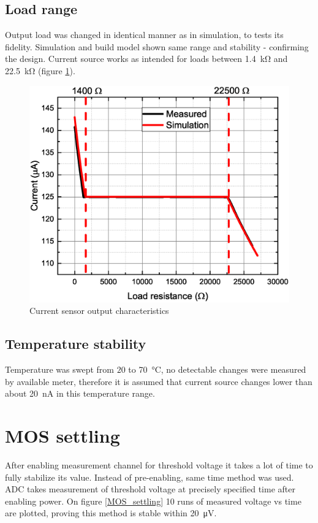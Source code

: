     \subsection{Load range}
        Output load was changed in identical manner as in simulation, to tests its fidelity. Simulation and build model shown same range and stability - confirming the design. Current source works as intended for loads between \SI{1.4}{\kilo\ohm} and \SI{22.5}{\kilo\ohm} (figure \ref{Current_sensor_output_characteristics}).
        \begin{figure}[H]
            \centering
            \includegraphics[width=0.6\paperwidth]{img/07/output_resistance.eps}
            \caption{Current sensor output characteristics}
            \label{Current_sensor_output_characteristics}
        \end{figure}

    \subsection{Temperature stability}
        Temperature was swept from $20$ to \SI{70}{\degreeCelsius}, no detectable changes were measured by available meter, therefore it is assumed that current source changes lower than about \SI{20}{\nano\ampere} in this temperature range.

\section{MOS settling}
    After enabling measurement channel for threshold voltage it takes a lot of time to fully stabilize its value. Instead of pre-enabling, same time method was used. ADC takes measurement of threshold voltage at precisely specified time after enabling power. On figure \ref{MOS_settling} 10 runs of measured voltage vs time are plotted, proving this method is stable within \SI{20}{\uV}.

